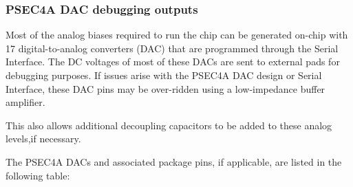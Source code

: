 \documentclass[12pt]{article}
\begin{document}
\subsubsection*{PSEC4A DAC debugging outputs}
Most of the analog biases required to run the chip can be generated on-chip with 17 digital-to-analog converters (DAC) that are programmed
through the Serial Interface.
The DC voltages of most of these DACs are sent to external pads for debugging purposes. If issues arise with the PSEC4A DAC design or Serial Interface,
these DAC pins may be over-ridden using a low-impedance buffer amplifier.

This also allows additional decoupling
capacitors to be added to these analog levels,if necessary.

The PSEC4A DACs and associated package pins, if applicable, are listed in the following table:
\end{document}
